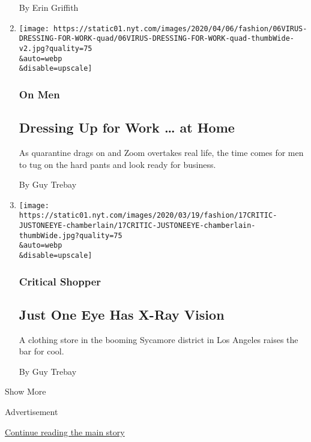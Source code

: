 \begin{enumerate}
  By Erin Griffith
\item
  \href{/2020/04/06/fashion/mens-fashion-work-from-home.html}{}

  \texttt{[image: https://static01.nyt.com/images/2020/04/06/fashion/06VIRUS-DRESSING-FOR-WORK-quad/06VIRUS-DRESSING-FOR-WORK-quad-thumbWide-v2.jpg?quality=75\\\&auto=webp\\\&disable=upscale]}

  \hypertarget{on-men}{%
  \subsubsection{On Men}\label{on-men}}

  \hypertarget{dressing-up-for-work--at-home}{%
  \subsection{Dressing Up for Work \ldots{} at
  Home}\label{dressing-up-for-work--at-home}}

  As quarantine drags on and Zoom overtakes real life, the time comes
  for men to tug on the hard pants and look ready for business.

  By Guy Trebay
\item
  \href{/2020/03/18/style/just-one-eye-has-x-ray-vision.html}{}

  \texttt{[image: https://static01.nyt.com/images/2020/03/19/fashion/17CRITIC-JUSTONEEYE-chamberlain/17CRITIC-JUSTONEEYE-chamberlain-thumbWide.jpg?quality=75\\\&auto=webp\\\&disable=upscale]}

  \hypertarget{critical-shopper}{%
  \subsubsection{Critical Shopper}\label{critical-shopper}}

  \hypertarget{just-one-eye-has-x-ray-vision}{%
  \subsection{Just One Eye Has X-Ray
  Vision}\label{just-one-eye-has-x-ray-vision}}

  A clothing store in the booming Sycamore district in Los Angeles
  raises the bar for cool.

  By Guy Trebay
\end{enumerate}

Show More

Advertisement

\protect\hyperlink{after-mid2}{Continue reading the main story}

